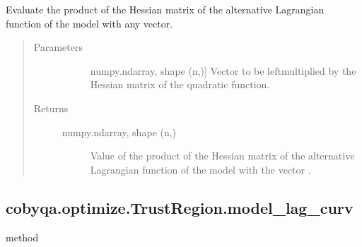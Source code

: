 \documentclass[letterpaper,10pt,english]{sphinxmanual}
\begin{document}
\begin{fulllineitems}
\begin{fulllineitems}
\label{\detokenize{refs/generated/cobyqa.optimize.TrustRegion.model_lag_alt_hessp:cobyqa.optimize.TrustRegion.model_lag_alt_hessp}}
\sphinxAtStartPar
Evaluate the product of the Hessian matrix of the alternative Lagrangian
function of the model with any vector.
\begin{quote}\begin{description}
\item[{Parameters}] \leavevmode\begin{description}
\item[{}] \leavevmode{[}numpy.ndarray, shape (n,){]}
\sphinxAtStartPar
Vector to be left\sphinxhyphen{}multiplied by the Hessian matrix of the quadratic
function.

\end{description}

\item[{Returns}] \leavevmode\begin{description}
\item[{numpy.ndarray, shape (n,)}] \leavevmode
\sphinxAtStartPar
Value of the product of the Hessian matrix of the alternative
Lagrangian function of the model with the vector .

\end{description}

\end{description}\end{quote}

\end{fulllineitems}



\subsection{cobyqa.optimize.TrustRegion.model\_lag\_curv}
\label{\detokenize{refs/generated/cobyqa.optimize.TrustRegion.model_lag_curv:cobyqa-optimize-trustregion-model-lag-curv}}\label{\detokenize{refs/generated/cobyqa.optimize.TrustRegion.model_lag_curv::doc}}
\sphinxAtStartPar
method


\end{fulllineitems}
\end{document}
